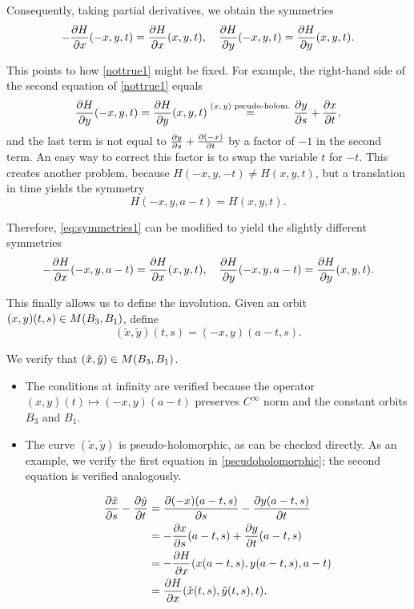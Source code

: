 Consequently, taking partial derivatives, we obtain the symmetries
\begin{equation}\label{eq:symmetries1}
- \diffp H x(-x,y,t) = \diffp H x(x,y,t),\quad \diffp H y(-x,y,t) = \diffp H y (x,y,t).
\end{equation}

This points to how \eqref{nottrue1} might be fixed. For example, the right-hand side of the second equation of \eqref{nottrue1} equals
\begin{equation}
\diffp H y (-x,y,t) = \diffp H y (x,y,t) \stackrel{\text{$(x,y)$ pseudo-holom.}}{=} \diffp y s + \diffp{x} t,
\end{equation}
and the last term is not equal to $\diffp y s + \diffp{(-x)} t$ by a factor of $-1$ in the second term. An easy way to correct this factor is to swap the variable $t$ for $-t$. This creates another problem, because $H(-x,y,-t) \neq H(x,y,t)$, but a translation in time yields the symmetry
\begin{equation}
H(-x,y,a - t) = H(x,y,t).
\end{equation}

Therefore, \eqref{eq:symmetries1} can be modified to yield the slightly different symmetries
\begin{equation}
- \diffp H x(-x,y,a-t) = \diffp H x(x,y,t),\quad \diffp H y(-x,y,a-t) = \diffp H y (x,y,t).
\end{equation}

This finally allows us to define the involution. Given an orbit $(x,y)(t,s) \in M(B_3,B_1)$, define
\begin{equation}
(\tilde x, \tilde y)(t,s) = (-x,y)(a-t,s).
\end{equation}

We verify that $(\tilde x, \tilde y) \in M(B_3, B_1)$.
\begin{itemize}
\item The conditions at infinity are verified because the operator $(x,y)(t) \mapsto (-x,y)(a-t)$ preserves $C^\infty$ norm and the constant orbits $B_3$ and $B_1$.

\item The curve $(\tilde x, \tilde y)$ is pseudo-holomorphic, as can be checked directly. As an example, we verify the first equation in \eqref{pseudoholomorphic}; the second equation is verified analogously.

\begin{equation}
\begin{aligned}
\diffp{\tilde x}s - \diffp{\tilde y}t &= \diffp{(-x)(a-t,s)}s - \diffp{y(a-t,s)}t\\
&= - \diffp x s(a-t, s) + \diffp y t(a-t, s)\\
&= - \diffp H x (x(a-t,s), y(a-t,s), a-t)\\
&= \diffp H x (\tilde x(t, s), \tilde y(t, s), t).
\end{aligned}
\end{equation}
\end{itemize}

